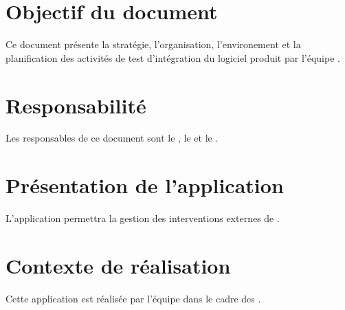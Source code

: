 \section{Objectif du document}
	Ce document présente la stratégie, l'organisation, l'environement et la planification des activités de test d'intégration du logiciel produit par l'équipe \nomEquipe{}.
	
\section{Responsabilité}
	Les responsables de ce document sont le \CP, le \RQ{} et le \RD.
	
\section{Présentation de l'application}
	L'application permettra la gestion des interventions externes de \nomClient.
	
\section{Contexte de réalisation}
	Cette application est réalisée par l'équipe \nomEquipe{} dans le cadre des \PIC.

